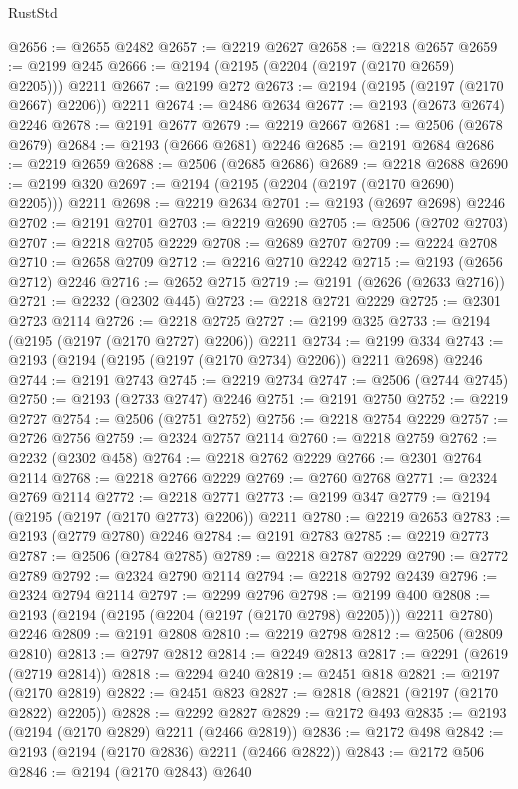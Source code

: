 \begin{lexlean}{RustStd}
\begin{coremodule}
@2656 := @2655 @2482
@2657 := @2219 @2627
@2658 := @2218 @2657
@2659 := @2199 @245
@2666 := @2194 (@2195 (@2204 (@2197 (@2170 @2659) @2205))) @2211
@2667 := @2199 @272
@2673 := @2194 (@2195 (@2197 (@2170 @2667) @2206)) @2211
@2674 := @2486 @2634
@2677 := @2193 (@2673 @2674) @2246
@2678 := @2191 @2677
@2679 := @2219 @2667
@2681 := @2506 (@2678 @2679)
@2684 := @2193 (@2666 @2681) @2246
@2685 := @2191 @2684
@2686 := @2219 @2659
@2688 := @2506 (@2685 @2686)
@2689 := @2218 @2688
@2690 := @2199 @320
@2697 := @2194 (@2195 (@2204 (@2197 (@2170 @2690) @2205))) @2211
@2698 := @2219 @2634
@2701 := @2193 (@2697 @2698) @2246
@2702 := @2191 @2701
@2703 := @2219 @2690
@2705 := @2506 (@2702 @2703)
@2707 := @2218 @2705 @2229
@2708 := @2689 @2707
@2709 := @2224 @2708
@2710 := @2658 @2709
@2712 := @2216 @2710 @2242
@2715 := @2193 (@2656 @2712) @2246
@2716 := @2652 @2715
@2719 := @2191 (@2626 (@2633 @2716))
@2721 := @2232 (@2302 @445)
@2723 := @2218 @2721 @2229
@2725 := @2301 @2723 @2114
@2726 := @2218 @2725
@2727 := @2199 @325
@2733 := @2194 (@2195 (@2197 (@2170 @2727) @2206)) @2211
@2734 := @2199 @334
@2743 := @2193 (@2194 (@2195 (@2197 (@2170 @2734) @2206)) @2211 @2698) @2246
@2744 := @2191 @2743
@2745 := @2219 @2734
@2747 := @2506 (@2744 @2745)
@2750 := @2193 (@2733 @2747) @2246
@2751 := @2191 @2750
@2752 := @2219 @2727
@2754 := @2506 (@2751 @2752)
@2756 := @2218 @2754 @2229
@2757 := @2726 @2756
@2759 := @2324 @2757 @2114
@2760 := @2218 @2759
@2762 := @2232 (@2302 @458)
@2764 := @2218 @2762 @2229
@2766 := @2301 @2764 @2114
@2768 := @2218 @2766 @2229
@2769 := @2760 @2768
@2771 := @2324 @2769 @2114
@2772 := @2218 @2771
@2773 := @2199 @347
@2779 := @2194 (@2195 (@2197 (@2170 @2773) @2206)) @2211
@2780 := @2219 @2653
@2783 := @2193 (@2779 @2780) @2246
@2784 := @2191 @2783
@2785 := @2219 @2773
@2787 := @2506 (@2784 @2785)
@2789 := @2218 @2787 @2229
@2790 := @2772 @2789
@2792 := @2324 @2790 @2114
@2794 := @2218 @2792 @2439
@2796 := @2324 @2794 @2114
@2797 := @2299 @2796
@2798 := @2199 @400
@2808 := @2193 (@2194 (@2195 (@2204 (@2197 (@2170 @2798) @2205))) @2211 @2780) @2246
@2809 := @2191 @2808
@2810 := @2219 @2798
@2812 := @2506 (@2809 @2810)
@2813 := @2797 @2812
@2814 := @2249 @2813
@2817 := @2291 (@2619 (@2719 @2814))
@2818 := @2294 @240
@2819 := @2451 @818
@2821 := @2197 (@2170 @2819)
@2822 := @2451 @823
@2827 := @2818 (@2821 (@2197 (@2170 @2822) @2205))
@2828 := @2292 @2827
@2829 := @2172 @493
@2835 := @2193 (@2194 (@2170 @2829) @2211 (@2466 @2819))
@2836 := @2172 @498
@2842 := @2193 (@2194 (@2170 @2836) @2211 (@2466 @2822))
@2843 := @2172 @506
@2846 := @2194 (@2170 @2843) @2640

\end{coremodule}
\end{lexlean}
